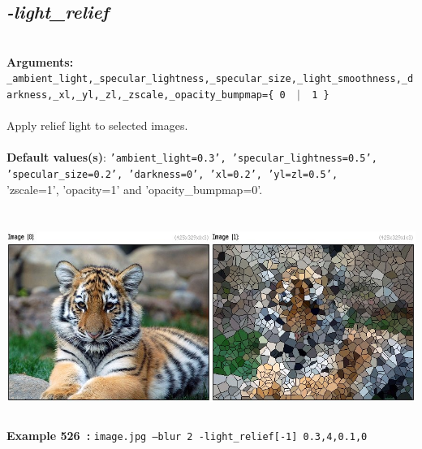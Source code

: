 \documentclass[a4paper,11pt,twoside]{book}
\begin{document}
\subsection{\emph{-light\_relief} }\vspace*{-0.5em}
~\\\textbf{Arguments: } 
{\small \texttt{\_ambient\_light,\_specular\_lightness,\_specular\_size,\_light\_smoothness,\_darkness,\_xl,\_yl,\_zl,\_zscale,\_opacity\_bumpmap=\{ 0 ~$|$~ 1 \}}}\\~\\
Apply relief light to selected images.
~\\~\\\textbf{Default values(s)}: {\small \texttt{'ambient\_light=0.3', 'specular\_lightness=0.5', 'specular\_size=0.2', 'darkness=0', 'xl=0.2', 'yl=zl=0.5',}}
~\\'zscale=1', 'opacity=1' and 'opacity\_bumpmap=0'.
\begin{center}\includegraphics[keepaspectratio=true,height=7cm,width=\textwidth]{img/gmic_def526.jpg}\\
{\footnotesize \textbf{Example 526~:} \texttt{image.jpg --blur 2 -light\_relief[-1] 0.3,4,0.1,0}}
\end{center}
\end{document}
